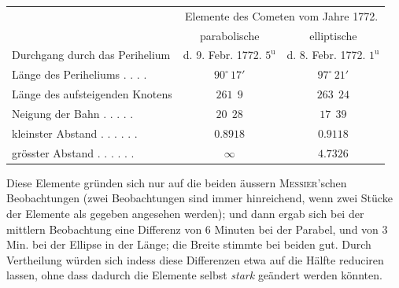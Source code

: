 \begin{center}\begingroup
\fontsize{8}{10}\selectfont
\setlength{\tabcolsep}{2pt}\renewcommand{\arraystretch}{1.12}
\begin{tabular}{l|c|c}
& \multicolumn{2}{c}{Elemente des Cometen vom Jahre 1772.} \\
 & parabolische & elliptische \\
\hline
Durchgang durch das Perihelium & d. 9. Febr. 1772. $5^{\mathrm{u}}$ & d. 8. Febr. 1772. $1^{\mathrm{u}}$ \\
Länge des Periheliums . . . . & $90^{\circ}\,17'$ & $97^{\circ}\,21'$ \\
Länge des aufsteigenden Knotens & $261\ \ 9$ & $263\ \ 24$ \\
Neigung der Bahn . . . . . & $20\ \ 28$ & $17\ \ 39$ \\
kleinster Abstand . . . . . . & $0.8918$ & $0.9118$ \\
grösster Abstand . . . . . . & $\infty$ & $4.7326$ \\
\end{tabular}\endgroup\end{center}

\par\indent Diese Elemente gründen sich nur auf die beiden äussern \textsc{Messier}'schen Beobachtungen (zwei Beobachtungen
sind immer hinreichend, wenn zwei Stücke der Elemente als gegeben angesehen werden);
und dann ergab sich bei der mittlern Beobachtung eine Differenz von 6 Minuten bei der Parabel, und
von 3 Min. bei der Ellipse in der Länge; die Breite stimmte bei beiden gut. Durch Vertheilung würden
sich indess diese Differenzen etwa auf die Hälfte reduciren lassen, ohne dass dadurch die Elemente selbst
\emph{stark} geändert werden könnten.

